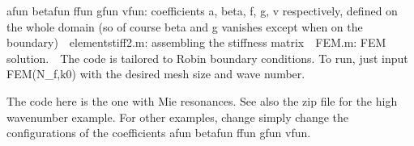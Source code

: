  afun betafun ffun gfun vfun: coefficients a, beta, f, g, v respectively, defined on the whole domain (so of course beta and g vanishes except when on the boundary)\
\
elementstiff2.m: assembling the stiffness matrix\
\
FEM.m: FEM solution.\
\
The code is tailored to Robin boundary conditions. To run, just input FEM(N_f,k0) with the desired mesh size and wave number.

The code here is the one with Mie resonances. See also the zip file for the high wavenumber example. For other examples, change simply change the configurations of the coefficients afun betafun ffun gfun vfun.
